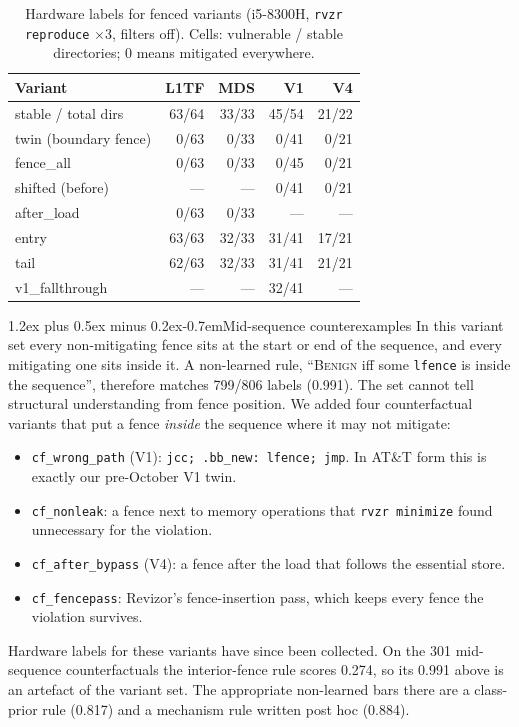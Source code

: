 \documentclass[conference]{IEEEtran}
\makeatletter
\renewcommand\paragraph{\@startsection{paragraph}{4}{\z@}%
  {1.2ex plus 0.5ex minus 0.2ex}{-0.7em}{\normalfont\normalsize\bfseries}}
\newcommand{\cls}[1]{\textsc{#1}}
\makeatother
\begin{document}
\begin{table}[t]
\centering
\caption{Hardware labels for fenced variants (i5-8300H, \texttt{rvzr
  reproduce} $\times 3$, filters off). Cells: vulnerable / stable
  directories; 0 means mitigated everywhere.}
\label{tab:hwlabel}
\footnotesize
\setlength{\tabcolsep}{3pt}
\begin{tabular}{@{}lrrrr@{}}
\toprule
Variant & L1TF & MDS & V1 & V4 \\
\midrule
stable / total dirs & 63/64 & 33/33 & 45/54 & 21/22 \\
\midrule
twin (boundary fence) & 0/63 & 0/33 & 0/41 & 0/21 \\
fence\_all            & 0/63 & 0/33 & 0/45 & 0/21 \\
shifted (before)      & ---  & ---  & 0/41 & 0/21 \\
after\_load           & 0/63 & 0/33 & ---  & ---  \\
entry                 & 63/63 & 32/33 & 31/41 & 17/21 \\
tail                  & 62/63 & 32/33 & 31/41 & 21/21 \\
v1\_fallthrough       & ---  & ---  & 32/41 & --- \\
\bottomrule
\end{tabular}
\end{table}

\paragraph{Mid-sequence counterexamples}
In this variant set every non-mitigating fence sits at the start or end of the
sequence, and every mitigating one sits inside it. A non-learned rule,
``\cls{Benign} iff some \texttt{lfence} is inside the sequence'', therefore matches
799/806 labels (0.991). The set cannot tell structural understanding from
fence position. We added four counterfactual variants that put a fence
\emph{inside} the sequence where it may not mitigate:
\begin{itemize}[itemsep=0pt,leftmargin=1.2em]
  \item \texttt{cf\_wrong\_path} (V1): \texttt{jcc; .bb\_new: lfence; jmp}.
    In AT\&T form this is exactly our pre-October V1 twin.
  \item \texttt{cf\_nonleak}: a fence next to memory operations that
    \texttt{rvzr minimize} found unnecessary for the violation.
  \item \texttt{cf\_after\_bypass} (V4): a fence after the load that follows
    the essential store.
  \item \texttt{cf\_fencepass}: Revizor's fence-insertion pass, which keeps
    every fence the violation survives.
\end{itemize}
Hardware labels for these variants have since been collected. On the 301
mid-sequence counterfactuals the interior-fence rule scores 0.274, so its
0.991 above is an artefact of the variant set. The appropriate non-learned
bars there are a class-prior rule (0.817) and a mechanism rule written post
hoc (0.884).
\end{document}
